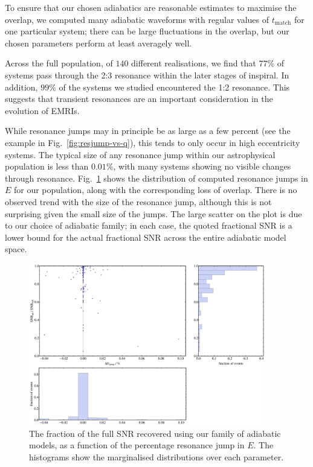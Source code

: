\documentclass[aps,prd,amsfonts,amssymb,amsmath,nofootinbib,reprint,showpacs,superscriptaddress,twocolumn]{revtex4}
\newcommand{\figref}[1]{Fig.\ \ref{fig:#1}}
\newcommand{\Figref}[1]{Fig.\ \ref{fig:#1}}
\begin{document}
To ensure that our chosen adiabatics are reasonable estimates to maximise the overlap, we computed many adiabatic waveforms with regular values of $t_\mathrm{match}$ for one particular system; there can be large fluctuations in the overlap, but our chosen parameters perform at least averagely well.

Across the full population, of $140$ different realisations, we find that $77\%$ of systems pass through the 2:3 resonance within the later stages of inspiral. In addition, $99\%$ of the systems we studied encountered the 1:2 resonance. This suggests that transient resonances are an important consideration in the evolution of EMRIs.

While resonance jumps may in principle be as large as a few percent (see the example in \figref{resjump-vs-q}), this tends to only occur in high eccentricity systems. The typical size of any resonance jump within our astrophysical population is less than $0.01\%$, with many systems showing no visible changes through resonance. \Figref{pop-SNR-vs-jump} shows the distribution of computed resonance jumps in $E$ for our population, along with the corresponding loss of overlap. There is no observed trend with the size of the resonance jump, although this is not surprising given the small size of the jumps. The large scatter on the plot is due to our choice of adiabatic family; in each case, the quoted fractional SNR is a lower bound for the actual fractional SNR across the entire adiabatic model space.

\begin{figure}[htbp]
\centering
\includegraphics[width=0.92\textwidth]{Fig_pop_SNR_vs_jump}
\caption{\label{fig:pop-SNR-vs-jump}The fraction of the full SNR recovered using our family of adiabatic models, as a function of the percentage resonance jump in $E$. The histograms show the marginalised distributions over each parameter.}
\end{figure}
\end{document}

